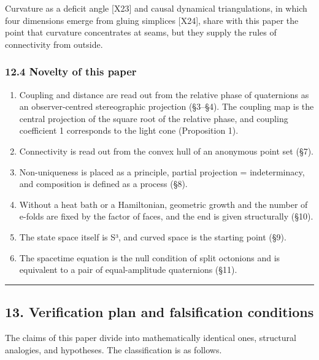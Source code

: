 \documentclass[
  a4paper,
]{article}
\providecommand{\tightlist}{%
  \setlength{\itemsep}{0pt}\setlength{\parskip}{0pt}}
\begin{document}
Curvature as a deficit angle {[}X23{]} and causal dynamical
triangulations, in which four dimensions emerge from gluing simplices
{[}X24{]}, share with this paper the point that curvature concentrates
at seams, but they supply the rules of connectivity from outside.

\subsubsection{12.4 Novelty of this paper}\label{novelty-of-this-paper}

\begin{enumerate}
\def\labelenumi{\arabic{enumi}.}
\tightlist
\item
  Coupling and distance are read out from the relative phase of
  quaternions as an observer-centred stereographic projection (§3--§4).
  The coupling map is the central projection of the square root of the
  relative phase, and coupling coefficient 1 corresponds to the light
  cone (Proposition 1).
\item
  Connectivity is read out from the convex hull of an anonymous point
  set (§7).
\item
  Non-uniqueness is placed as a principle, partial projection =
  indeterminacy, and composition is defined as a process (§8).
\item
  Without a heat bath or a Hamiltonian, geometric growth and the number
  of e-folds are fixed by the factor of faces, and the end is given
  structurally (§10).
\item
  The state space itself is S³, and curved space is the starting point
  (§9).
\item
  The spacetime equation is the null condition of split octonions and is
  equivalent to a pair of equal-amplitude quaternions (§11).
\end{enumerate}

\begin{center}\rule{0.5\linewidth}{0.5pt}\end{center}

\subsection{13. Verification plan and falsification
conditions}\label{verification-plan-and-falsification-conditions}

The claims of this paper divide into mathematically identical ones,
structural analogies, and hypotheses. The classification is as follows.
\end{document}
